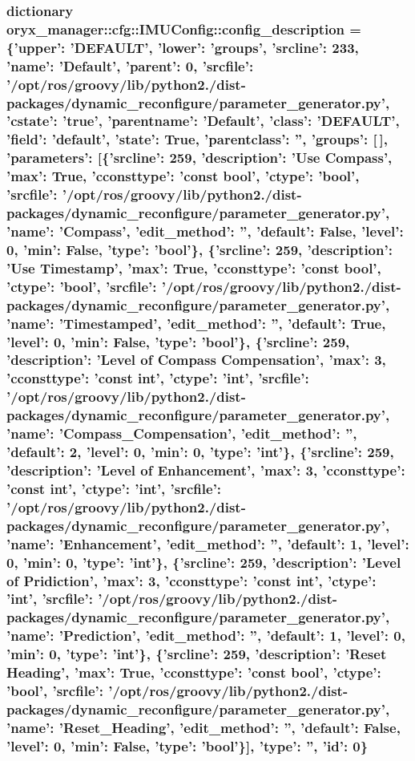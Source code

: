 \subsubsection[{config\-\_\-description}]{\setlength{\rightskip}{0pt plus 5cm}dictionary {\bf oryx\-\_\-manager\-::cfg\-::\-I\-M\-U\-Config\-::config\-\_\-description} = \{'upper'\-: '\-D\-E\-F\-A\-U\-L\-T', 'lower'\-: 'groups', 'srcline'\-: 233, 'name'\-: '\-Default', 'parent'\-: 0, 'srcfile'\-: '/opt/ros/groovy/lib/python2./dist-\/packages/dynamic\-\_\-reconfigure/parameter\-\_\-generator.\-py', 'cstate'\-: 'true', 'parentname'\-: '\-Default', 'class'\-: '\-D\-E\-F\-A\-U\-L\-T', 'field'\-: '{\bf default}', 'state'\-: \-True, 'parentclass'\-: '', 'groups'\-: [$\,$], 'parameters'\-: [\{'srcline'\-: 259, 'description'\-: '\-Use {\bf \-Compass}', '{\bf max}'\-: \-True, 'cconsttype'\-: 'const bool', 'ctype'\-: 'bool', 'srcfile'\-: '/opt/ros/groovy/lib/python2./dist-\/packages/dynamic\-\_\-reconfigure/parameter\-\_\-generator.\-py', 'name'\-: '{\bf \-Compass}', 'edit\-\_\-method'\-: '', '{\bf default}'\-: \-False, '{\bf level}'\-: 0, '{\bf min}'\-: \-False, '{\bf type}'\-: 'bool'\}, \{'srcline'\-: 259, 'description'\-: '\-Use \-Timestamp', '{\bf max}'\-: \-True, 'cconsttype'\-: 'const bool', 'ctype'\-: 'bool', 'srcfile'\-: '/opt/ros/groovy/lib/python2./dist-\/packages/dynamic\-\_\-reconfigure/parameter\-\_\-generator.\-py', 'name'\-: '{\bf \-Timestamped}', 'edit\-\_\-method'\-: '', '{\bf default}'\-: \-True, '{\bf level}'\-: 0, '{\bf min}'\-: \-False, '{\bf type}'\-: 'bool'\}, \{'srcline'\-: 259, 'description'\-: '\-Level of {\bf \-Compass} \-Compensation', '{\bf max}'\-: 3, 'cconsttype'\-: 'const int', 'ctype'\-: 'int', 'srcfile'\-: '/opt/ros/groovy/lib/python2./dist-\/packages/dynamic\-\_\-reconfigure/parameter\-\_\-generator.\-py', 'name'\-: '\-Compass\-\_\-\-Compensation', 'edit\-\_\-method'\-: '', '{\bf default}'\-: 2, '{\bf level}'\-: 0, '{\bf min}'\-: 0, '{\bf type}'\-: 'int'\}, \{'srcline'\-: 259, 'description'\-: '\-Level of {\bf \-Enhancement}', '{\bf max}'\-: 3, 'cconsttype'\-: 'const int', 'ctype'\-: 'int', 'srcfile'\-: '/opt/ros/groovy/lib/python2./dist-\/packages/dynamic\-\_\-reconfigure/parameter\-\_\-generator.\-py', 'name'\-: '{\bf \-Enhancement}', 'edit\-\_\-method'\-: '', '{\bf default}'\-: 1, '{\bf level}'\-: 0, '{\bf min}'\-: 0, '{\bf type}'\-: 'int'\}, \{'srcline'\-: 259, 'description'\-: '\-Level of \-Pridiction', '{\bf max}'\-: 3, 'cconsttype'\-: 'const int', 'ctype'\-: 'int', 'srcfile'\-: '/opt/ros/groovy/lib/python2./dist-\/packages/dynamic\-\_\-reconfigure/parameter\-\_\-generator.\-py', 'name'\-: '{\bf \-Prediction}', 'edit\-\_\-method'\-: '', '{\bf default}'\-: 1, '{\bf level}'\-: 0, '{\bf min}'\-: 0, '{\bf type}'\-: 'int'\}, \{'srcline'\-: 259, 'description'\-: '\-Reset \-Heading', '{\bf max}'\-: \-True, 'cconsttype'\-: 'const bool', 'ctype'\-: 'bool', 'srcfile'\-: '/opt/ros/groovy/lib/python2./dist-\/packages/dynamic\-\_\-reconfigure/parameter\-\_\-generator.\-py', 'name'\-: '\-Reset\-\_\-\-Heading', 'edit\-\_\-method'\-: '', '{\bf default}'\-: \-False, '{\bf level}'\-: 0, '{\bf min}'\-: \-False, '{\bf type}'\-: 'bool'\}], '{\bf type}'\-: '', 'id'\-: 0\}}\label{namespaceoryx__manager_1_1cfg_1_1IMUConfig_a2cd158d3dc29072a29e40761d889b213}


